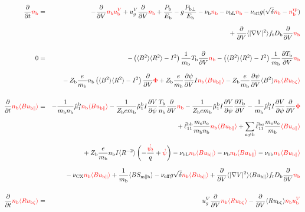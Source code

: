 \documentclass[11pt]{article}
\def\r#1{{\rm#1}}
\def\aves#1{\langle#1\rangle}
\def\dd#1#2{\frac{\partial #1}{\partial #2}}
\def\para{\parallel}
\def\ddV{\frac{\partial}{\partial V}}
\def\ddt{\frac{\partial}{\partial t}}
\def\psid{\dot{\psi}}
\def\psit{\psi_t}
\def\psitd{\dot{\psit}}
\def\me{m_\r{e}}
\def\mb{m_\r{b}}
\def\nee{n_\r{e}}
\def\nb{n_\r{b}}
\def\Tb{T_\r{b}}
\def\Zb{Z_\r{b}}
\def\uzt#1{u_{\r{#1}\zeta}}
\def\upara#1{u_{\r{#1}\para}}
\def\uV#1{u_\r{#1}^V}
\def\ugV{u_{g}^V}
\def\nun#1{\nu_\r{0#1}}
\def\nbrp{n_\r{b}^\r{rp}}
\def\Db{D_\r{b}}
\def\bri{\aves{B^2}\aves{R^2} - I^2}
\def\Pbpara{P_{\r{b}\parallel}}
\def\Pbperp{P_{\r{b}\perp}}
\def\Pb{P_\r{b}}
\def\Eb{E_\r{b}}
\def\nueff{\nu_\r{eff}}
\def\nuCX{\nu_\r{CX}}
\def\nub{\nu_\r{b}}
\def\nubL{\nu_\r{bL}}
\def\red#1{\textcolor{red}{#1}}
\begin{document}
%
\begin{eqnarray}
  \ddt \red{\nb} &=&
%
  - \ddV \red{\nb\uV{b}}
%
  + \ugV \ddV \red{\nb}
%
  +  \frac{\Pb}{\Eb}
%
  - g \frac{\Pbperp}{\Eb}
%
  - \nub \red{\nb}
%
  - \nubL \red{\nb}
%
  - \nueff g (\sqrt{\delta} \red{\nb} - \red{\nbrp})
%
\nonumber\\[2.5mm]&&{}
  + \ddV \aves{|\nabla V|^2} f_t \Db \ddV \red{\nb}
%
\\[5mm]
  0 &=&
%
  -           \left( \bri \right) \frac{1}{\mb} \Tb \ddV \red{\nb}
  -           \left( \bri \right) \frac{1}{\mb} \dd{\Tb}{V} \red{\nb}
\nonumber\\[3mm]&&{}
%
  - \Zb \frac{e}{\mb} \nb \left( \bri \right) \ddV \red{\Phi}
%
  + \Zb \frac{e}{\mb} \dd{\psi}{V} I \red{\nb \aves{B\upara{b}}}
%
  - \Zb \frac{e}{\mb} \dd{\psi}{V} \aves{B^2} \red{\nb \aves{R\uzt{b}}}
\\[5mm]
  \ddt \red{\nb \aves{B \upara{b}}} &=&
%
  - \frac{1}{\mb \nb} \hat{\mu}_1^\r{b} \red{\nb \aves{B \upara{b}}}
%
  - \frac{1}{\Zb e\mb} \hat{\mu}_1^\r{b} I \dd{V}{\psi} \frac{\Tb}{\nb}
  \ddV \red{\nb}
  - \frac{1}{\Zb e\mb} \hat{\mu}_1^\r{b} I \dd{V}{\psi} \dd{\Tb}{V}
  - \frac{1}{\mb} \hat{\mu}_1^\r{b} I \dd{V}{\psi} \ddV \red{\Phi}
\nonumber\\[2.5mm]&&{}
%
  + \hat{\ell}_{11}^\r{bb} \frac{\me\nee}{\mb\nb} \red{\nb \aves{B \upara{b}}}
%
  + \sum_{a\neq\r{b}} \hat{\ell}_{11}^{\r{b}a} \frac{\me\nee}{\mb} \red{\aves{B u_{a\para}}}
\nonumber\\[2.5mm]&&{}
%
  + \Zb \frac{e}{\mb} \nb I \aves{R^{-2}} \left( - \frac{\red{\psitd}}{q} + \red{\psid} \right)
%
  - \nubL \red{\nb \aves{B\upara{b}}}
%
  - \nub  \red{\nb \aves{B\upara{b}}}
%
  - \nun{b} \red{\nb \aves{B\upara{b}}}
\nonumber\\[2.5mm]&&{}
%
  - \nuCX \red{\nb \aves{B\upara{b}}}
%
%
  + \frac{1}{\mb} \aves{B S_{\r{m}\para\r{b}}}
%
  - \nueff g \sqrt{\delta} \red{\nb \aves{B\upara{b}}}
%
  + \ddV \aves{|\nabla V|^2} \aves{B\upara{b}} f_t \Db \ddV \red{\nb}
\\[5mm]
  \ddt \red{\nb \aves{R \uzt{b}}} &=&
%
  \ugV \ddV \red{\nb \aves{R \uzt{b}}}
%
  - \ddV \aves{R \uzt{b}} \red{\nb \uV{b}} 
%

\end{eqnarray}
\end{document}
